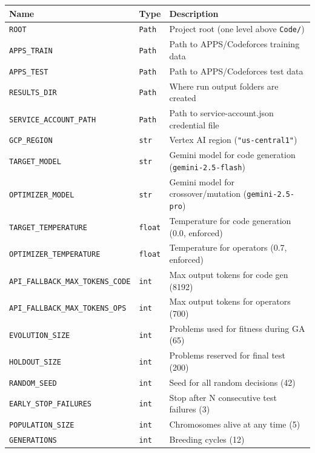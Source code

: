 \documentclass[11pt,a4paper]{report}
\newcommand{\fn}[1]{\texttt{#1}}
\begin{document}
\begin{table}[h]
\centering
\begin{tabular}{@{}llp{7cm}@{}}
\toprule
\textbf{Name} & \textbf{Type} & \textbf{Description} \\
\midrule
\fn{ROOT}                    & \texttt{Path}  & Project root (one level above \texttt{Code/}) \\
\fn{APPS\_TRAIN}             & \texttt{Path}  & Path to APPS/Codeforces training data \\
\fn{APPS\_TEST}              & \texttt{Path}  & Path to APPS/Codeforces test data \\
\fn{RESULTS\_DIR}            & \texttt{Path}  & Where run output folders are created \\
\fn{SERVICE\_ACCOUNT\_PATH}  & \texttt{Path}  & Path to service-account.json credential file \\
\fn{GCP\_REGION}             & \texttt{str}   & Vertex AI region (\texttt{"us-central1"}) \\
\fn{TARGET\_MODEL}           & \texttt{str}   & Gemini model for code generation (\texttt{gemini-2.5-flash}) \\
\fn{OPTIMIZER\_MODEL}        & \texttt{str}   & Gemini model for crossover/mutation (\texttt{gemini-2.5-pro}) \\
\fn{TARGET\_TEMPERATURE}     & \texttt{float} & Temperature for code generation (0.0, enforced) \\
\fn{OPTIMIZER\_TEMPERATURE}  & \texttt{float} & Temperature for operators (0.7, enforced) \\
\fn{API\_FALLBACK\_MAX\_TOKENS\_CODE} & \texttt{int} & Max output tokens for code gen (8192) \\
\fn{API\_FALLBACK\_MAX\_TOKENS\_OPS}  & \texttt{int} & Max output tokens for operators (700) \\
\fn{EVOLUTION\_SIZE}         & \texttt{int}   & Problems used for fitness during GA (65) \\
\fn{HOLDOUT\_SIZE}           & \texttt{int}   & Problems reserved for final test (200) \\
\fn{RANDOM\_SEED}            & \texttt{int}   & Seed for all random decisions (42) \\
\fn{EARLY\_STOP\_FAILURES}   & \texttt{int}   & Stop after N consecutive test failures (3) \\
\fn{POPULATION\_SIZE}        & \texttt{int}   & Chromosomes alive at any time (5) \\
\fn{GENERATIONS}             & \texttt{int}   & Breeding cycles (12) \\

\end{tabular}
\end{table}
\end{document}
